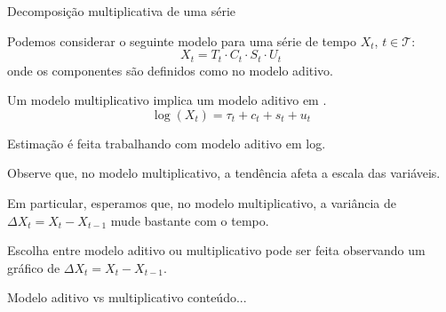\documentclass[11pt]{beamer}
\newenvironment{halfwideitemize}{\itemize\addtolength{\itemsep}{0.5em}}{\enditemize}
\begin{document}
\begin{frame}{Decomposição multiplicativa de uma série}
	\begin{halfwideitemize}
		\item Podemos considerar o seguinte modelo para uma série de tempo $X_t$, $t \in \mathcal{T}$:
		\begin{equation}
			X_t = 	T_t \cdot C_t \cdot S_t \cdot U_t
		\end{equation}
		onde os componentes são definidos como no modelo aditivo.
		\item Um modelo multiplicativo implica um modelo aditivo em .
		\begin{equation}
			\log(X_t) = \tau_t + c_t + s_t + u_t
		\end{equation}
		\begin{halfwideitemize}
			\item Estimação é feita trabalhando com modelo aditivo em log.
		\end{halfwideitemize}
		\item Observe que, no modelo multiplicativo, a tendência afeta a {\color{blue}escala} das variáveis.
		\begin{halfwideitemize}
			\item Em particular, esperamos que, no modelo multiplicativo, a variância de $\Delta X_t = X_{t} - X_{t-1}$ mude bastante com o tempo.
			\item Escolha entre modelo aditivo ou multiplicativo pode ser feita observando um gráfico de $\Delta X_t = X_{t} - X_{t-1}$.
		\end{halfwideitemize}
	\end{halfwideitemize}
\end{frame}

\begin{frame}{Modelo aditivo vs multiplicativo}
	conteúdo...
\end{frame}
\end{document}
